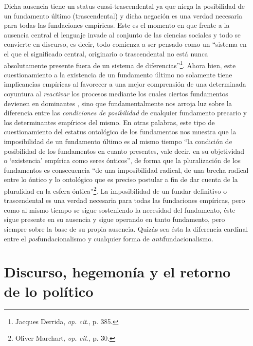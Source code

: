 Dicha ausencia tiene un status cuasi-trascendental ya que niega la posibilidad de un fundamento último (trascendental) y dicha negación es una verdad necesaria para todas las fundaciones empíricas. Este es el momento en que frente a la ausencia central el lenguaje invade al conjunto de las ciencias sociales y todo se convierte en discurso, es decir, todo comienza a ser pensado como un \enquote{sistema en el que el significado central, originario o trascendental no está nunca absolutamente presente fuera de un sistema de diferencias}\footnote{Jacques Derrida, \emph{op. cit}., p. 385.}. Ahora bien, este cuestionamiento a la existencia de un fundamento último no solamente tiene implicancias empíricas al favorecer a una mejor comprensión de una determinada coyuntura al \emph{reactivar} los procesos mediante los cuales ciertos fundamentos  devienen en dominantes , sino que fundamentalmente nos arroja luz sobre la diferencia entre las \emph{condiciones de posibilidad} de cualquier fundamento precario y los determinantes empíricos del mismo. En otras palabras, este tipo de cuestionamiento del estatus ontológico de los fundamentos nos muestra que la imposibilidad de un fundamento último es al mismo tiempo \enquote{la condición de posibilidad de los fundamentos en cuanto presentes, vale decir, en su objetividad o \enquote{existencia} empírica como seres ónticos}, de forma que la pluralización de los fundamentos es consecuencia \enquote{de una imposibilidad radical, de una brecha radical entre lo óntico y lo ontológico que es preciso postular a fin de dar cuenta de la pluralidad en la esfera óntica}\footnote{Oliver Marchart, \emph{op. cit}., p. 30.}. La imposibilidad de un fundar definitivo o trascendental es una verdad necesaria  para todas las fundaciones empíricas, pero como al mismo tiempo se sigue sosteniendo la necesidad del fundamento, éste sigue presente en su ausencia y sigue operando en tanto fundamento, pero siempre sobre la base de su propia ausencia. Quizás sea ésta la diferencia cardinal entre el \emph{pos}fundacionalismo y cualquier forma de \emph{anti}fundacionalismo.

\section{Discurso, hegemonía y el retorno de lo político}

